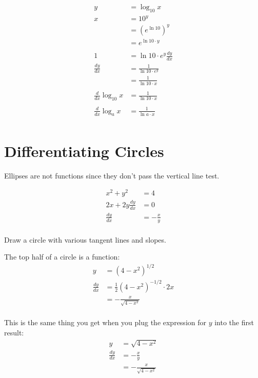 \documentclass[letterpaper, landscape]{exam}
\begin{document}
  \begin{align*}
    y                        & = \log_{10} x \\
    x                        & = 10^y \\
                             & = \left( e^{\ln 10} \right)^y \\
                             & = e^{\ln 10 \cdot y} \\
    \\
    1                        & = \ln 10 \cdot e^y \frac{dy}{dx} \\
    \frac{dy}{dx}            & = \frac{1}{\ln 10 \cdot e^y} \\
                             & = \frac{1}{\ln 10 \cdot x} \\
    \\
    \frac{d}{dx} \log_{10} x & = \frac{1}{\ln 10 \cdot x} \\
    \\
    \frac{d}{dx} \log_a x    & = \frac{1}{\ln a \cdot x} \\
  \end{align*}

  \section{Differentiating Circles} %
  
  Ellipses are not functions since they don't pass the vertical line test.

  \begin{align*}
    x^2 + y^2             & = 4 \\
    2x + 2y \frac{dy}{dx} & = 0 \\
    \frac{dy}{dx}         & = - \frac{x}{y} \\
  \end{align*}

  Draw a circle with various tangent lines and slopes.

  The top half of a circle is a function:
  \begin{align*}
    y             & = \left( 4 - x^2 \right)^{1/2} \\
    \frac{dy}{dx} & = \frac{1}{2} \left( 4 - x^2 \right)^{-1/2} \cdot 2x \\
                  & = - \frac{x}{\sqrt{4 - x^2}} \\
  \end{align*}

  This is the same thing you get when you plug the expression for $y$ into the first result:
  \begin{align*}
    y             & = \sqrt{ 4 - x^2 } \\
    \frac{dy}{dx} & = - \frac{x}{y} \\
                  & = - \frac{x}{ \sqrt{ 4 - x^2 } } \\
  \end{align*}
  
\end{document}
